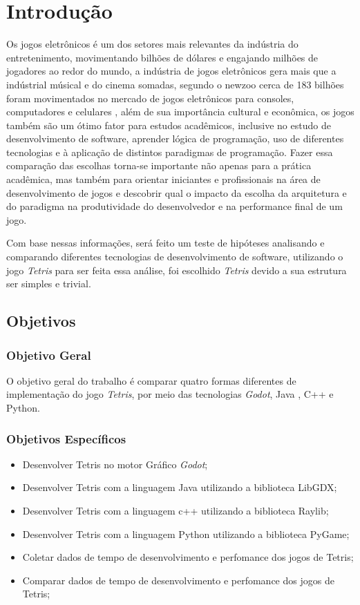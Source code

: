\chapter{Introdução}
\label{cap:01}

Os jogos eletrônicos é um dos setores mais relevantes da indústria do entretenimento,
movimentando bilhões de dólares e engajando milhões de jogadores ao redor do mundo, 
a indústria de jogos eletrônicos gera mais que a indústrial músical e do cinema somadas,
segundo o newzoo cerca de 183 bilhões foram movimentados no mercado de jogos eletrônicos
para consoles, computadores e celulares \cite{Newzoo, Statista2025GamesMarket}, além de sua importância cultural
e econômica, os jogos também são um ótimo fator para estudos acadêmicos, inclusive no
estudo de desenvolvimento de software, aprender lógica de programação, uso de diferentes tecnologias e à 
aplicação de distintos paradigmas de programação.
Fazer essa comparação das escolhas torna-se importante não apenas para a prática
acadêmica, mas também para orientar iniciantes e profissionais na área de desenvolvimento de jogos e 
descobrir qual o impacto da escolha da arquitetura e do paradigma na produtividade do desenvolvedor e na 
performance final de um jogo.

Com base nessas informações, será feito um teste de hipóteses analisando e comparando diferentes tecnologias de desenvolvimento de software,
utilizando o jogo \textit{Tetris} para ser feita essa análise, foi escolhido \textit{Tetris} devido a sua estrutura ser simples e trivial.


\section{Objetivos}

\subsection{Objetivo Geral}

O objetivo geral do trabalho é comparar quatro formas diferentes de implementação do jogo \textit{Tetris}, por meio
das tecnologias \textit{Godot}, Java , C++ e Python.

\subsection{Objetivos Específicos}
\begin{itemize}
	\item Desenvolver Tetris no motor Gráfico \textit{Godot};
	\item Desenvolver Tetris com a linguagem Java utilizando a biblioteca LibGDX;
	\item Desenvolver Tetris com a linguagem c++ utilizando a biblioteca Raylib;
	\item Desenvolver Tetris com a linguagem Python utilizando a biblioteca PyGame;
	\item Coletar dados de tempo de desenvolvimento e perfomance dos jogos de Tetris;
	\item Comparar dados de tempo de desenvolvimento e perfomance dos jogos de Tetris;
\end{itemize}